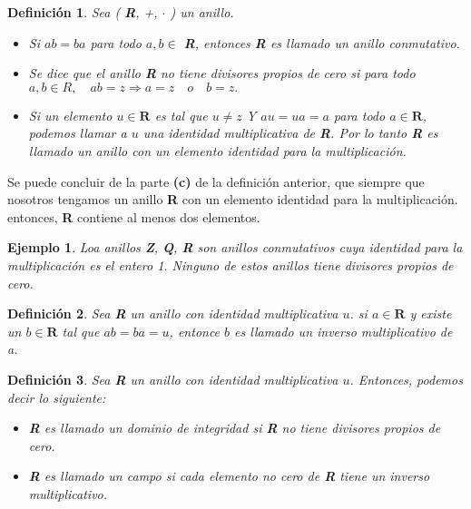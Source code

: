 \documentclass{llncs}
\theoremstyle{plane}
\newtheorem{defi}{Definición}
\newtheorem{ej}{Ejemplo}
\begin{document}
\begin{defi}
Sea ( \textbf{R}, +, $\cdot$ ) un anillo.


\begin{itemize}
\item [\textbf{a)}] Si $ab=ba$ para todo $a, b \in$ \textbf{R}, entonces \textbf{R} es llamado un anillo \textit{conmutativo}.  

\item [\textbf{b)}] Se dice que el anillo \textbf{R} \textit{no tiene divisores propios de cero} si para todo $a, b \in R, \quad ab =z \Rightarrow a= z \quad o \quad b=z.$

\item [\textbf{c)}] Si un elemento $u \in \mathbf{R}$ es tal que $u \neq z$ Y $au=ua=a$ para todo $a \in \mathbf{R}$, podemos llamar a $u$ una identidad multiplicativa de \textbf{R}. Por lo tanto \textbf{R} es llamado un anillo con un elemento identidad para la multiplicación.

\end{itemize}
\end{defi}

Se puede concluir de la parte \textbf{ (c)} de la definición anterior, que siempre que nosotros tengamos un anillo \textbf{R} con un elemento identidad para la multiplicación. entonces, \textbf{R} contiene al menos dos elementos.


\begin{ej}
Loa anillos \textbf{Z}, \textbf{Q}, \textbf{R} son anillos conmutativos cuya identidad para la multiplicación es el entero 1. Ninguno de estos anillos tiene divisores propios de cero. 
\end{ej}

\begin{defi}
Sea \textbf{R} un anillo con identidad multiplicativa $u$. si $a \in \textbf{R}$ y existe un $b \in \textbf{R}$ tal que $ab= ba = u$, entonce $b$ es llamado un \textit{inverso multiplicativo} de \textit{a}.
\end{defi}

\begin{defi}
Sea \textbf{R} un anillo con identidad multiplicativa $u$. Entonces, podemos decir lo siguiente:
\begin{itemize}
\item [\textbf{a)}] \textbf{R} es llamado un \textit{dominio de integridad} si \textbf{R} no tiene divisores propios de cero.
\item [\textbf{b)}] \textbf{R} es llamado un \textit{campo}  si cada elemento no cero de \textbf{R} tiene un inverso multiplicativo.
\end{itemize}
\end{defi}
\end{document}
